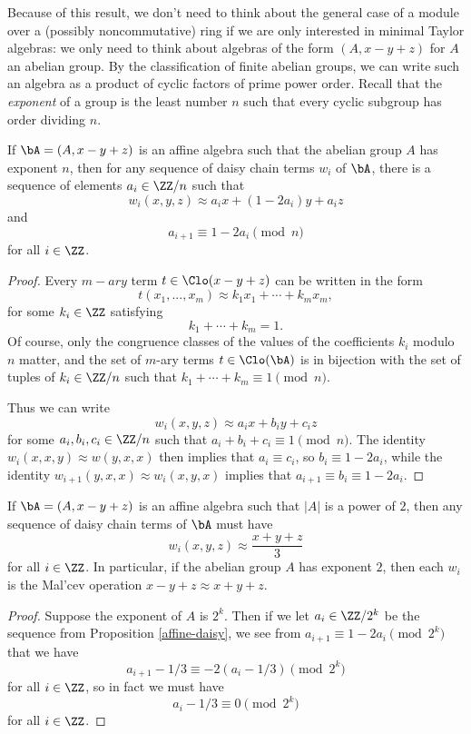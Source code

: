 Because of this result, we don't need to think about the general case of a module over a (possibly noncommutative) ring if we are only interested in minimal Taylor algebras: we only need to think about algebras of the form $(A, x-y+z)$ for $A$ an abelian group. By the classification of finite abelian groups, we can write such an algebra as a product of cyclic factors of prime power order. Recall that the \emph{exponent} of a group is the least number $n$ such that every cyclic subgroup has order dividing $n$.

\begin{prop}\label{affine-daisy} If $\bA = (A,x-y+z)$ is an affine algebra such that the abelian group $A$ has exponent $n$, then for any sequence of daisy chain terms $w_i$ of $\bA$, there is a sequence of elements $a_i \in \ZZ/n$ such that
\[
w_i(x,y,z) \approx a_ix + (1-2a_i)y + a_iz
\]
and
\[
a_{i+1} \equiv 1-2a_i \pmod{n}
\]
for all $i \in \ZZ$.
\end{prop}
\begin{proof} Every $m-ary$ term $t \in \Clo(x-y+z)$ can be written in the form
\[
t(x_1, ..., x_m) \approx k_1x_1 + \cdots + k_mx_m,
\]
for some $k_i \in \ZZ$ satisfying
\[
k_1 + \cdots + k_m = 1.
\]
Of course, only the congruence classes of the values of the coefficients $k_i$ modulo $n$ matter, and the set of $m$-ary terms $t \in \Clo(\bA)$ is in bijection with the set of tuples of $k_i \in \ZZ/n$ such that $k_1 + \cdots + k_m \equiv 1 \pmod{n}$.

Thus we can write
\[
w_i(x,y,z) \approx a_ix + b_iy + c_iz
\]
for some $a_i,b_i,c_i \in \ZZ/n$ such that $a_i + b_i + c_i \equiv 1 \pmod{n}$. The identity $w_i(x,x,y) \approx w(y,x,x)$ then implies that $a_i \equiv c_i$, so $b_i \equiv 1 - 2a_i$, while the identity $w_{i+1}(y,x,x) \approx w_i(x,y,x)$ implies that $a_{i+1} \equiv b_i \equiv 1 - 2a_i$.
\end{proof}

\begin{prop} If $\bA = (A,x-y+z)$ is an affine algebra such that $|A|$ is a power of $2$, then any sequence of daisy chain terms of $\bA$ must have
\[
w_i(x,y,z) \approx \frac{x+y+z}{3}
\]
for all $i \in \ZZ$. In particular, if the abelian group $A$ has exponent $2$, then each $w_i$ is the Mal'cev operation $x-y+z \approx x+y+z$.
\end{prop}
\begin{proof} Suppose the exponent of $A$ is $2^k$. Then if we let $a_i \in \ZZ/2^k$ be the sequence from Proposition \ref{affine-daisy}, we see from $a_{i+1} \equiv 1 - 2a_i \pmod{2^k}$ that we have
\[
a_{i+1} - 1/3 \equiv -2(a_i - 1/3) \pmod{2^k}
\]
for all $i \in \ZZ$, so in fact we must have
\[
a_i - 1/3 \equiv 0 \pmod{2^k}
\]
for all $i \in \ZZ$.
\end{proof}


